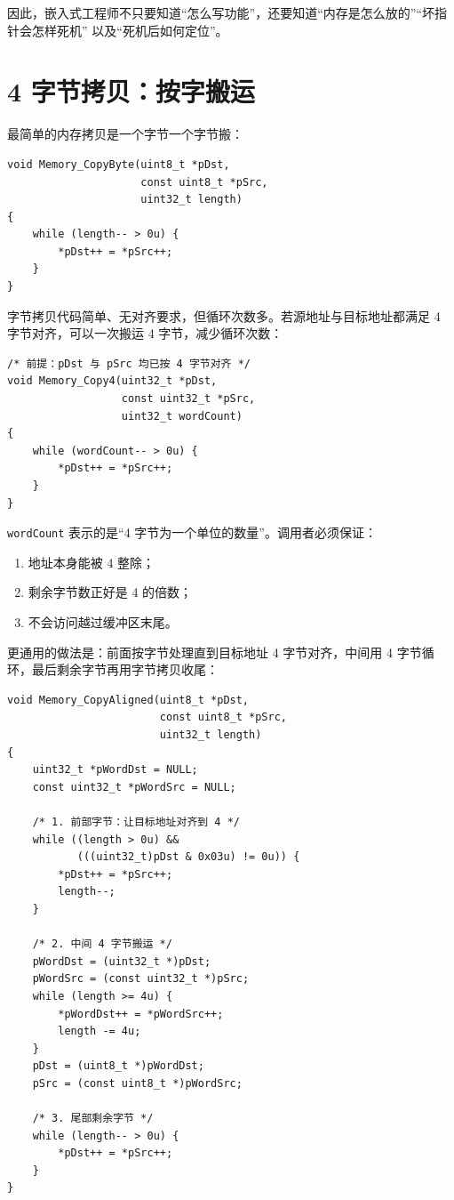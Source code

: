 因此，嵌入式工程师不只要知道“怎么写功能”，还要知道“内存是怎么放的”“坏指针会怎样死机” 以及“死机后如何定位”。

\section{4 字节拷贝：按字搬运}

最简单的内存拷贝是一个字节一个字节搬：

\begin{lstlisting}[style=c]
void Memory_CopyByte(uint8_t *pDst,
                     const uint8_t *pSrc,
                     uint32_t length)
{
    while (length-- > 0u) {
        *pDst++ = *pSrc++;
    }
}
\end{lstlisting}

字节拷贝代码简单、无对齐要求，但循环次数多。若源地址与目标地址都满足 4 字节对齐，可以一次搬运 4 字节，减少循环次数：

\begin{lstlisting}[style=c]
/* 前提：pDst 与 pSrc 均已按 4 字节对齐 */
void Memory_Copy4(uint32_t *pDst,
                  const uint32_t *pSrc,
                  uint32_t wordCount)
{
    while (wordCount-- > 0u) {
        *pDst++ = *pSrc++;
    }
}
\end{lstlisting}

\texttt{wordCount} 表示的是“4 字节为一个单位的数量”。调用者必须保证：

\begin{enumerate}
\item 地址本身能被 4 整除；
\item 剩余字节数正好是 4 的倍数；
\item 不会访问越过缓冲区末尾。
\end{enumerate}

更通用的做法是：前面按字节处理直到目标地址 4 字节对齐，中间用 4 字节循环，最后剩余字节再用字节拷贝收尾：

\begin{lstlisting}[style=c]
void Memory_CopyAligned(uint8_t *pDst,
                        const uint8_t *pSrc,
                        uint32_t length)
{
    uint32_t *pWordDst = NULL;
    const uint32_t *pWordSrc = NULL;

    /* 1. 前部字节：让目标地址对齐到 4 */
    while ((length > 0u) &&
           (((uint32_t)pDst & 0x03u) != 0u)) {
        *pDst++ = *pSrc++;
        length--;
    }

    /* 2. 中间 4 字节搬运 */
    pWordDst = (uint32_t *)pDst;
    pWordSrc = (const uint32_t *)pSrc;
    while (length >= 4u) {
        *pWordDst++ = *pWordSrc++;
        length -= 4u;
    }
    pDst = (uint8_t *)pWordDst;
    pSrc = (const uint8_t *)pWordSrc;

    /* 3. 尾部剩余字节 */
    while (length-- > 0u) {
        *pDst++ = *pSrc++;
    }
}
\end{lstlisting}


